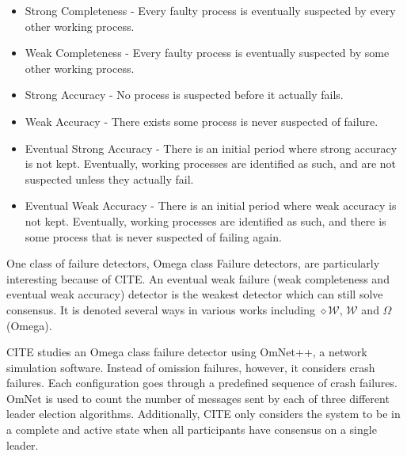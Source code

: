 \begin{itemize}
    \item Strong Completeness - Every faulty process is eventually suspected by
        every other working process.
    \item Weak Completeness - Every faulty process is eventually suspected by 
        some other working process.
    \item Strong Accuracy - No process is suspected before it actually fails.
    \item Weak Accuracy - There exists some process is never suspected of failure.
    \item Eventual Strong Accuracy - There is an initial period where strong
        accuracy is not kept. Eventually, working processes are identified
        as such, and are not suspected unless they actually fail.
    \item Eventual Weak Accuracy - There is an initial period where weak
        accuracy is not kept. Eventually, working processes are identified
        as such, and there is some process that is never suspected of failing
        again.
\end{itemize}

One class of failure detectors, Omega class Failure detectors, are particularly interesting
because of CITE. An eventual weak failure (weak completeness and eventual weak accuracy) 
detector is the weakest detector which can still solve consensus. It is denoted several ways
in various works including $\diamond \mathcal{W}$, $\mathcal{W}$ and $\Omega$ (Omega).

CITE studies an Omega class failure detector using OmNet++, a network simulation software.
Instead of omission failures, however, it considers crash failures. Each configuration goes
through a predefined sequence of crash failures. OmNet is used to count the number of messages
sent by each of three different leader election algorithms. Additionally, CITE only considers
the system to be in a complete and active state when all participants have consensus on a 
single leader.
